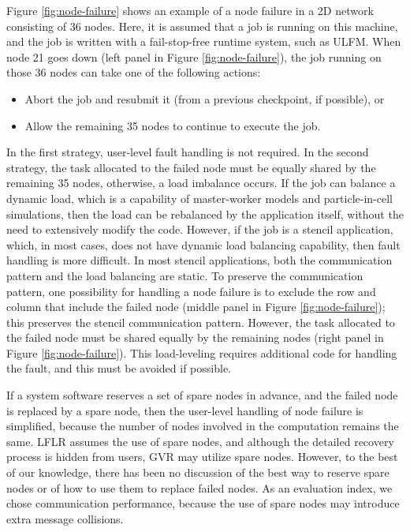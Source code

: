 \documentclass[Afour,times,sageh]{sagej}
\begin{document}
Figure \ref{fig:node-failure} shows an example of a node failure in a
2D network consisting of 36 nodes. Here, it is assumed that a job is
running on this machine, and the job is written with a fail-stop-free
runtime system, such as ULFM. When node 21 goes down (left panel in
Figure \ref{fig:node-failure}), the job running on those 36 nodes can
take one of the following actions:

\begin{itemize}
\item Abort the job and resubmit it (from a previous
  checkpoint, if possible), or
\item Allow the remaining 35 nodes to continue to execute the job.
\end{itemize}

In the first strategy, user-level fault handling is not required.
In the second strategy, the task allocated to the failed node must
be equally shared by the remaining 35 nodes, otherwise, a load
imbalance occurs. If the job can balance a dynamic load, which is a
capability of master-worker models and particle-in-cell simulations,
then the load can be rebalanced by the application itself, without the
need to extensively modify the code. However, if the job is a stencil
application, which, in most cases, does not have dynamic load
balancing capability, then fault handling is more difficult. In most
stencil applications, both the communication pattern and the load
balancing are static. To preserve the communication pattern, one
possibility for handling a node failure is to exclude the row and
column that include the failed node (middle panel in Figure
\ref{fig:node-failure}); this preserves the stencil communication
pattern. However, the task allocated to the failed node must be shared
equally by the remaining nodes (right panel in Figure
\ref{fig:node-failure}). This load-leveling requires additional code
for handling the fault, and this must be avoided if possible.

If a system software reserves a set of spare nodes in advance, and the
failed node is replaced by a spare node, then the user-level handling of
node failure is simplified, because the number of nodes involved in
the computation remains the same. LFLR assumes the use of spare nodes,
and although the detailed recovery process is hidden from users, GVR
may utilize spare nodes. However, to the best of our knowledge, there
has been no discussion of the best way to reserve spare nodes or of
how to use them to replace failed nodes. As an evaluation index, we
chose communication performance, because the use of spare nodes may
introduce extra message collisions.
\end{document}
